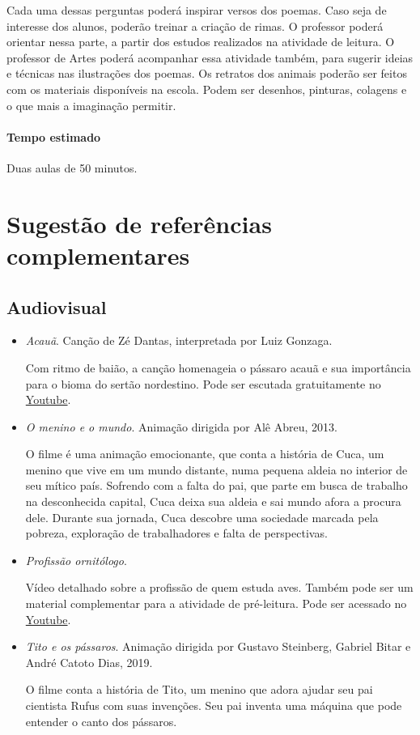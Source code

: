 \documentclass[11pt]{extarticle}
\begin{document}
Cada uma dessas perguntas poderá inspirar versos dos poemas. Caso seja de interesse dos alunos, poderão treinar a criação de rimas. O professor poderá orientar nessa parte, a partir dos estudos realizados na atividade de leitura. O professor de Artes poderá acompanhar essa atividade também, para sugerir ideias e técnicas nas ilustrações dos poemas. Os retratos dos animais poderão ser feitos com os materiais disponíveis na escola. Podem ser desenhos, pinturas, colagens e o que mais a imaginação permitir.

\paragraph{Tempo estimado} Duas aulas de 50 minutos.

\section{Sugestão de referências complementares}

\subsection{Audiovisual}

\begin{itemize}

\item \textit{Acauã}. Canção de Zé Dantas, interpretada por Luiz Gonzaga.

Com ritmo de baião, a canção homenageia o pássaro acauã e sua importância para o bioma do sertão nordestino. Pode ser escutada gratuitamente no \href{https://youtu.be/NGVW49KZVgg}{Youtube}.

\item \textit{O menino e o mundo}. Animação dirigida por Alê Abreu, 2013.

O filme é uma animação emocionante, que conta a história de Cuca, um menino que vive em um mundo distante, numa pequena aldeia no interior de seu mítico país. Sofrendo com a falta do pai, que parte em busca de trabalho na desconhecida capital, Cuca deixa sua aldeia e sai mundo afora a procura dele. Durante sua jornada, Cuca descobre uma sociedade marcada pela pobreza, exploração de trabalhadores e falta de perspectivas.

\item \textit{Profissão ornitólogo}.

Vídeo detalhado sobre a profissão de quem estuda aves. Também pode ser um material complementar para a atividade de pré-leitura. Pode ser acessado no \href{https://youtu.be/2swKMwcnYTM}{Youtube}.

\item \textit{Tito e os pássaros}. Animação dirigida por Gustavo Steinberg, Gabriel Bitar e André Catoto Dias, 2019.

O filme conta a história de Tito, um menino que adora ajudar seu pai cientista Rufus com suas invenções. Seu pai inventa uma máquina que pode entender o canto dos pássaros.

\end{itemize}
\end{document}
